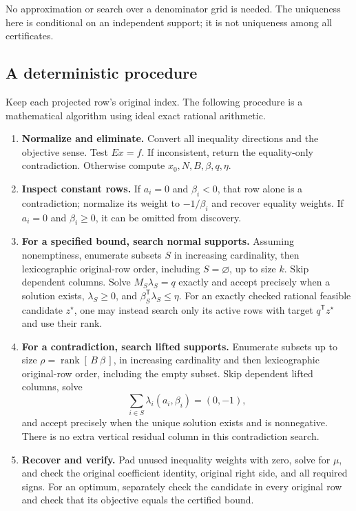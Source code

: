 \documentclass[11pt,letterpaper]{article}
\newcommand{\T}{\mathsf T}
\DeclareMathOperator{\rank}{rank}
\theoremstyle{definition}
\theoremstyle{remark}
\numberwithin{equation}{section}
\begin{document}
No approximation or search over a denominator grid is needed. The uniqueness
here is conditional on an independent support; it is not uniqueness among all
certificates.

\subsection{A deterministic procedure}

Keep each projected row's original index. The following procedure is a
mathematical algorithm using ideal exact rational arithmetic.

\begin{enumerate}[label=\textbf{\arabic*.},leftmargin=*]
\item \textbf{Normalize and eliminate.}
Convert all inequality directions and the objective sense.
Test \(Ex=f\). If inconsistent, return the equality-only contradiction.
Otherwise compute \(x_0,N,B,\beta,q,\eta\).

\item \textbf{Inspect constant rows.}
If \(a_i=0\) and \(\beta_i<0\), that row alone is a contradiction; normalize
its weight to \(-1/\beta_i\) and recover equality weights.
If \(a_i=0\) and \(\beta_i\ge0\), it can be omitted from discovery.

\item \textbf{For a specified bound, search normal supports.}
Assuming nonemptiness, enumerate subsets \(S\) in increasing cardinality,
then lexicographic original-row order, including \(S=\varnothing\), up to
size \(k\). Skip dependent columns. Solve \(M_S\lambda_S=q\) exactly and
accept precisely when a solution exists, \(\lambda_S\ge0\), and
\(\beta_S^\T\lambda_S\le\eta\).
For an exactly checked rational feasible candidate \(z^\star\), one may instead search only
its active rows with target \(q^\T z^\star\) and use their rank.

\item \textbf{For a contradiction, search lifted supports.}
Enumerate subsets up to size \(\rho=\rank[\,B\ \beta\,]\), in increasing
cardinality and then lexicographic original-row order, including the empty subset.
Skip dependent lifted columns, solve
\[
 \sum_{i\in S}\lambda_i(a_i,\beta_i)=(0,-1),
\]
and accept precisely when the unique solution exists and is nonnegative.
There is no extra vertical residual column in this contradiction search.

\item \textbf{Recover and verify.}
Pad unused inequality weights with zero, solve for \(\mu\), and check the
original coefficient identity, original right side, and all required signs.
For an optimum, separately check the candidate in every original row and
check that its objective equals the certified bound.
\end{enumerate}
\end{document}
